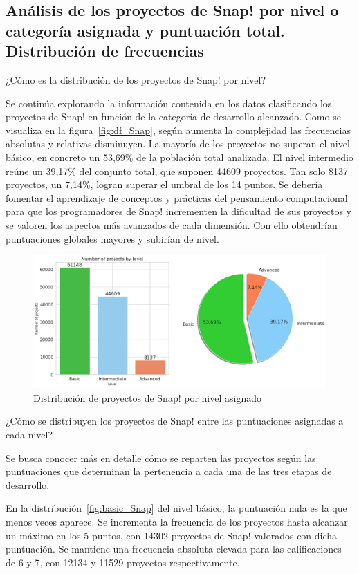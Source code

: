 \documentclass[a4paper, 12pt]{book}
\begin{document}
\subsection{Análisis de los proyectos de Snap! por nivel o categoría asignada y puntuación total. Distribución de frecuencias}
\label{subsec:frec_nivel_Snap}

¿Cómo es la distribución de los proyectos de Snap! por nivel?

Se continúa explorando la información contenida en los datos clasificando los proyectos de Snap! en función de la categoría de desarrollo alcanzado. Como se visualiza en la figura~\ref{fig:df_Snap}, según aumenta la complejidad las frecuencias absolutas y relativas disminuyen. La mayoría de los proyectos no superan el nivel básico, en concreto un 53,69\% de la población total analizada. El nivel intermedio reúne un 39,17\% del conjunto total, que suponen 44609 proyectos. Tan solo 8137 proyectos, un 7,14\%, logran superar el umbral de los 14 puntos. Se debería fomentar el aprendizaje de conceptos y prácticas del pensamiento computacional para que los programadores de Snap! incrementen la dificultad de sus proyectos y se valoren los aspectos más avanzados de cada dimensión. Con ello obtendrían puntuaciones globales mayores y subirían de nivel.

\begin{figure}[H]
    \centering
    \includegraphics[width=.95\textwidth]{img/freq_level_Snap.png}
    \caption{Distribución de proyectos de Snap! por nivel asignado}\label{fig:level_Snap}
\end{figure}

¿Cómo se distribuyen los proyectos de Snap! entre las puntuaciones asignadas a cada nivel?

Se busca conocer más en detalle cómo se reparten las proyectos según las puntuaciones que determinan la pertenencia a cada una de las tres etapas de desarrollo.

En la distribución~\ref{fig:basic_Snap} del nivel básico, la puntuación nula es la que menos veces aparece. Se incrementa la frecuencia de los proyectos hasta alcanzar un máximo en los 5 puntos, con 14302 proyectos de Snap! valorados con dicha puntuación. Se mantiene una frecuencia absoluta elevada para las calificaciones de 6 y 7, con 12134 y 11529 proyectos respectivamente.
\end{document}
